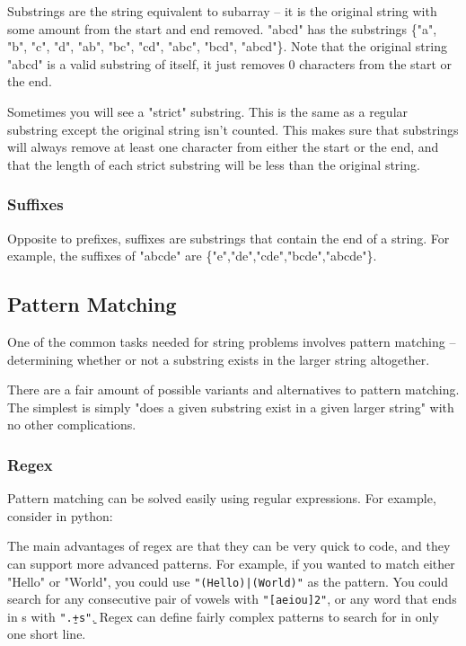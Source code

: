 Substrings are the string equivalent to subarray -- it is the original string with some amount from the start and end removed. "abcd" has the substrings \{"a", "b", "c", "d", "ab", "bc", "cd", "abc", "bcd", "abcd"\}. Note that the original string "abcd" is a valid substring of itself, it just removes 0 characters from the start or the end.

Sometimes you will see a "strict" substring. This is the same as a regular substring except the original string isn't counted. This makes sure that substrings will always remove at least one character from either the start or the end, and that the length of each strict substring will be less than the original string.

\subsubsection{Suffixes}

Opposite to prefixes, suffixes are substrings that contain the end of a string. For example, the suffixes of "abcde" are \{"e","de","cde","bcde","abcde"\}.

\subsection{Pattern Matching}

One of the common tasks needed for string problems involves pattern matching -- determining whether or not a substring exists in the larger string altogether.

There are a fair amount of possible variants and alternatives to pattern matching. The simplest is simply "does a given substring exist in a given larger string" with no other complications.

\subsubsection{Regex}

Pattern matching can be solved easily using regular expressions. For example, consider in python:


The main advantages of regex are that they can be very quick to code, and they can support more advanced patterns. For example, if you wanted to match either "Hello" or "World", you could use \texttt{"(Hello)|(World)"} as the pattern. You could search for any consecutive pair of vowels with \texttt{"[aeiou]{2}"}, or any word that ends in s with \texttt{"\b.+s\b"}. Regex can define fairly complex patterns to search for in only one short line.

